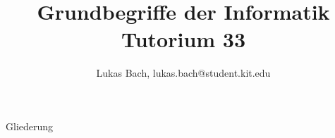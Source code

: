 \documentclass[handout]{beamer}
\title[Grundbegriffe der Informatik]{Grundbegriffe der Informatik\\Tutorium 33}
\subtitle{}
\author{Lukas Bach, lukas.bach@student.kit.edu}
\date{\tutdate}
\institute{}
\begin{document}
	


\begin{frame}
	\titlepage
\end{frame}

\ifdefined\printmode
	\ifdefined\compileall \else
	\begin{frame}{Gliederung}
		\tableofcontents
	\end{frame}
\fi\fi

\fi
\end{document}
